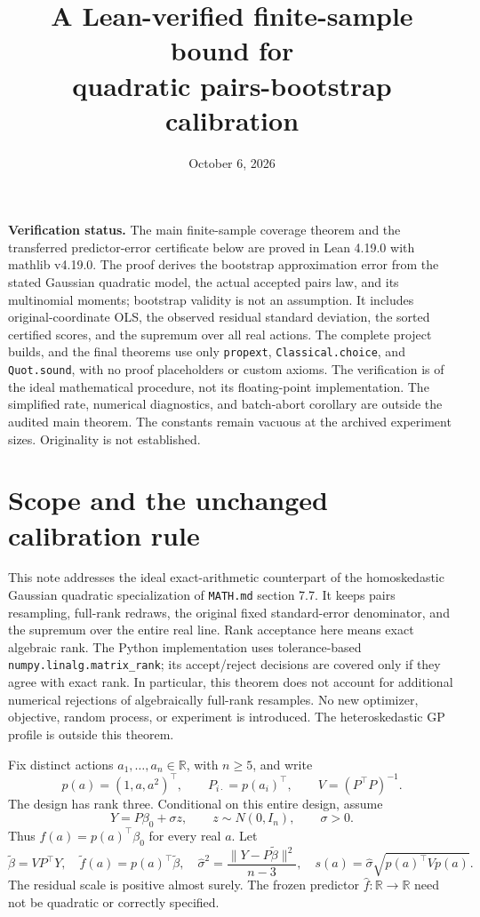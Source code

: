 \documentclass[11pt]{article}
\title{A Lean-verified finite-sample bound for\protect\\
quadratic pairs-bootstrap calibration}
\author{}
\date{October 6, 2026}
\newcommand{\R}{\mathbb R}
\begin{document}
\maketitle

\noindent\textbf{Verification status.}
The main finite-sample coverage theorem and the transferred predictor-error
certificate below are proved in Lean 4.19.0 with mathlib v4.19.0. The proof
derives the bootstrap approximation error from the stated Gaussian quadratic
model, the actual accepted pairs law, and its multinomial moments; bootstrap
validity is not an assumption. It includes original-coordinate OLS, the
observed residual standard deviation, the sorted certified scores, and the
supremum over all real actions. The complete project builds, and the final
theorems use only \texttt{propext}, \texttt{Classical.choice}, and
\texttt{Quot.sound}, with no proof placeholders or custom axioms.
The verification is of the ideal mathematical procedure, not its floating-point
implementation. The simplified rate, numerical diagnostics, and batch-abort
corollary are outside the audited main theorem. The constants remain vacuous
at the archived experiment sizes. Originality is not established.

\section{Scope and the unchanged calibration rule}

This note addresses the ideal exact-arithmetic counterpart of the
homoskedastic Gaussian quadratic specialization of
\texttt{MATH.md} section 7.7. It keeps pairs resampling, full-rank redraws, the
original fixed standard-error denominator, and the supremum over the entire
real line. Rank acceptance here means exact algebraic rank. The Python
implementation uses tolerance-based \texttt{numpy.linalg.matrix\_rank};
its accept/reject decisions are covered only if they agree with exact rank.
In particular, this theorem does not account for additional numerical
rejections of algebraically full-rank resamples. No new optimizer, objective,
random process, or experiment is introduced. The heteroskedastic GP profile
is outside this theorem.

Fix distinct actions $a_1,\ldots,a_n\in\R$, with $n\ge5$, and write
\[
 p(a)=(1,a,a^2)^\top,\qquad P_{i\cdot}=p(a_i)^\top,
 \qquad V=(P^\top P)^{-1}.
\]
The design has rank three. Conditional on this entire design, assume
\[
 Y=P\beta_0+\sigma z,\qquad z\sim N(0,I_n),\qquad \sigma>0.
\]
Thus $f(a)=p(a)^\top\beta_0$ for every real $a$. Let
\[
 \widetilde\beta=VP^\top Y,\quad
 \widetilde f(a)=p(a)^\top\widetilde\beta,\quad
 \widehat\sigma^2=\frac{\|Y-P\widetilde\beta\|^2}{n-3},\quad
 s(a)=\widehat\sigma\sqrt{p(a)^\top Vp(a)}.
\]
The residual scale is positive almost surely. The frozen predictor
$\widehat f:\R\to\R$ need not be quadratic or correctly specified.
\end{document}
